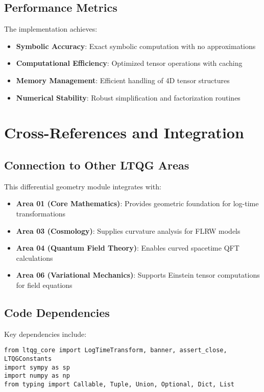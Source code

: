 \documentclass[11pt,a4paper]{article}
\theoremstyle{definition}
\theoremstyle{remark}
\begin{document}
\subsection{Performance Metrics}

The implementation achieves:
\begin{itemize}
\item \textbf{Symbolic Accuracy}: Exact symbolic computation with no approximations
\item \textbf{Computational Efficiency}: Optimized tensor operations with caching
\item \textbf{Memory Management}: Efficient handling of 4D tensor structures
\item \textbf{Numerical Stability}: Robust simplification and factorization routines
\end{itemize}

\section{Cross-References and Integration}

\subsection{Connection to Other LTQG Areas}

This differential geometry module integrates with:
\begin{itemize}
\item \textbf{Area 01 (Core Mathematics)}: Provides geometric foundation for log-time transformations
\item \textbf{Area 03 (Cosmology)}: Supplies curvature analysis for FLRW models  
\item \textbf{Area 04 (Quantum Field Theory)}: Enables curved spacetime QFT calculations
\item \textbf{Area 06 (Variational Mechanics)}: Supports Einstein tensor computations for field equations
\end{itemize}

\subsection{Code Dependencies}

Key dependencies include:
\begin{lstlisting}
from ltqg_core import LogTimeTransform, banner, assert_close, LTQGConstants
import sympy as sp
import numpy as np
from typing import Callable, Tuple, Union, Optional, Dict, List
\end{lstlisting}
\end{document}

